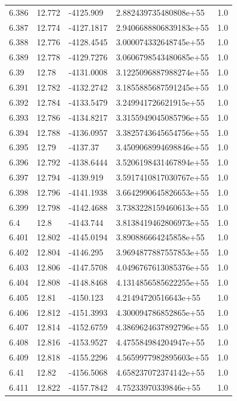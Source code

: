 \begin{tabular}{lllll}
6.386 & 12.772 & -4125.909 & 2.882439735480808e+55 & 1.0 \\
6.387 & 12.774 & -4127.1817 & 2.9406688806839183e+55 & 1.0 \\
6.388 & 12.776 & -4128.4545 & 3.000074332648745e+55 & 1.0 \\
6.389 & 12.778 & -4129.7276 & 3.0606798543480685e+55 & 1.0 \\
6.39 & 12.78 & -4131.0008 & 3.1225096887988274e+55 & 1.0 \\
6.391 & 12.782 & -4132.2742 & 3.1855885687591245e+55 & 1.0 \\
6.392 & 12.784 & -4133.5479 & 3.249941726621915e+55 & 1.0 \\
6.393 & 12.786 & -4134.8217 & 3.3155949045085796e+55 & 1.0 \\
6.394 & 12.788 & -4136.0957 & 3.3825743645654756e+55 & 1.0 \\
6.395 & 12.79 & -4137.37 & 3.4509068994698846e+55 & 1.0 \\
6.396 & 12.792 & -4138.6444 & 3.5206198431467894e+55 & 1.0 \\
6.397 & 12.794 & -4139.919 & 3.5917410817030767e+55 & 1.0 \\
6.398 & 12.796 & -4141.1938 & 3.6642990645826653e+55 & 1.0 \\
6.399 & 12.798 & -4142.4688 & 3.7383228159460613e+55 & 1.0 \\
6.4 & 12.8 & -4143.744 & 3.8138419462806973e+55 & 1.0 \\
6.401 & 12.802 & -4145.0194 & 3.890886664245858e+55 & 1.0 \\
6.402 & 12.804 & -4146.295 & 3.9694877887557853e+55 & 1.0 \\
6.403 & 12.806 & -4147.5708 & 4.0496767613085376e+55 & 1.0 \\
6.404 & 12.808 & -4148.8468 & 4.1314856585622255e+55 & 1.0 \\
6.405 & 12.81 & -4150.123 & 4.21494720516643e+55 & 1.0 \\
6.406 & 12.812 & -4151.3993 & 4.300094786852865e+55 & 1.0 \\
6.407 & 12.814 & -4152.6759 & 4.3869624637892796e+55 & 1.0 \\
6.408 & 12.816 & -4153.9527 & 4.475584984204947e+55 & 1.0 \\
6.409 & 12.818 & -4155.2296 & 4.5659977982895603e+55 & 1.0 \\
6.41 & 12.82 & -4156.5068 & 4.658237072374142e+55 & 1.0 \\
6.411 & 12.822 & -4157.7842 & 4.75233970339846e+55 & 1.0 \\

\end{tabular}
